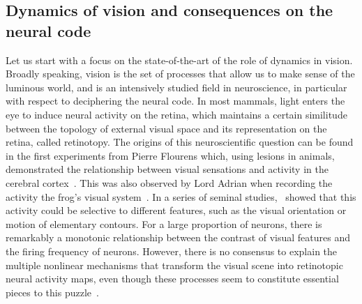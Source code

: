 \documentclass[brainsci, %
               review,submit,pdftex,moreauthors
               ]{Definitions/mdpi}
\begin{document}
\subsection{Dynamics of vision and consequences on the neural code}%
%
Let us start with a focus on the state-of-the-art of the role of dynamics in vision. Broadly speaking, vision is the set of processes that allow us to make sense of the luminous world, and is an intensively studied field in neuroscience, in particular with respect to deciphering the neural code. In most mammals, light enters the eye to induce neural activity on the retina, which maintains a certain similitude between the topology of external visual space and its representation on the retina, called retinotopy. The origins of this neuroscientific question can be found in the first experiments from Pierre Flourens which, using lesions in animals, demonstrated the relationship between visual sensations and activity in the cerebral cortex~\citep{flourens_recherches_1842,pearce_marie-jean-pierre_2009}. This was also observed by Lord Adrian when recording the activity the frog's visual system~\citep{adrian_impulses_1926}. In a series of seminal studies,~\citet{hubel_receptive_1968} showed that this activity could be selective to different features, such as the visual orientation or motion of elementary contours. For a large proportion of neurons, there is remarkably a monotonic relationship between the contrast of visual features and the firing frequency of neurons. However, there is no consensus to explain the multiple nonlinear mechanisms that transform the visual scene into retinotopic neural activity maps, even though these processes seem to constitute essential pieces to this puzzle~\citep{carandini_normalization_2012}. 
\end{document}
